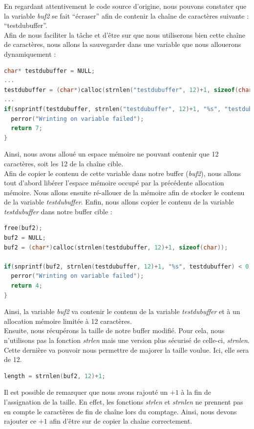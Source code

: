En regardant attentivement le code source d'origine, nous pouvons constater que la variable \textit{buf2} se fait \enquote{écraser} afin de contenir la chaîne de caractères suivante : \enquote{testdubuffer}.\\
Afin de nous faciliter la tâche et d'être sur que nous utiliserons bien cette chaîne de caractères, nous allons la sauvegarder dans une variable que nous allouerons dynamiquement :
\begin{lstlisting}[language=C, breaklines=true]
char* testdubuffer = NULL;
...
testdubuffer = (char*)calloc(strnlen("testdubuffer", 12)+1, sizeof(char));
...
if(snprintf(testdubuffer, strnlen("testdubuffer", 12)+1, "%s", "testdubuffer") < 0){
  perror("Wrinting on variable failed");
  return 7;
}
\end{lstlisting}
Ainsi, nous avons alloué un espace mémoire ne pouvant contenir que 12 caractères, soit les 12 de la chaîne cible.\\
Afin de copier le contenu de cette variable dans notre buffer (\textit{buf2}), nous allons tout d'abord libérer l'espace mémoire occupé par la précédente allocation mémoire. Nous allons ensuite ré-allouer de la mémoire afin de stocker le contenu de la variable \textit{testdubuffer}. Enfin, nous allons copier le contenu de la variable \textit{testdubuffer} dans notre buffer cible :
\begin{lstlisting}[language=C]
free(buf2);
buf2 = NULL;
buf2 = (char*)calloc(strnlen(testdubuffer, 12)+1, sizeof(char));

if(snprintf(buf2, strnlen(testdubuffer, 12)+1, "%s", testdubuffer) < 0){
  perror("Wrinting on variable failed");
  return 4;
}
\end{lstlisting}
Ainsi, la variable \textit{buf2} va contenir le contenu de la variable \textit{testdubuffer} et à un allocation mémoire limitée à 12 caractères.\\
Ensuite, nous récupérons la taille de notre buffer modifié. Pour cela, nous n'utilisons pas la fonction \textit{strlen} mais une version plus sécurisé de celle-ci, \textit{strnlen}. Cette dernière va pouvoir nous permettre de majorer la taille voulue. Ici, elle sera de 12.\\
\begin{lstlisting}[language=C]
length = strnlen(buf2, 12)+1;
\end{lstlisting}
Il est possible de remarquer que nous avons rajouté un $+1$ à la fin de l'assignation de la taille. En effet, les fonctions \textit{strlen} et \textit{strnlen} ne prennent pas en compte le caractères de fin de chaîne lors du comptage. Ainsi, nous devons rajouter ce $+1$ afin d'être sur de copier la chaîne correctement.

